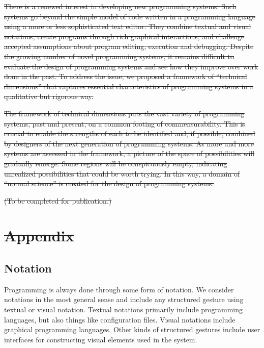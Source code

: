 \documentclass[english,submission]{programming}
\providecommand{\DIFdel}[1]{{\protect\color{red}\sout{#1}}}                      %
\providecommand{\DIFdelend}{} %
\begin{document}
\DIFdel{There is a renewed interest in developing new programming systems. Such
systems go beyond the simple model of code written in a programming
language using a more or less sophisticated text editor. They combine
textual and visual notations, create programs through rich graphical
interactions, and challenge accepted assumptions about program editing,
execution and debugging. Despite the growing number of novel programming
systems, it remains difficult to evaluate the design of programming
systems and see how they improve over work done in the past. To address
the issue, we proposed a framework of ``technical dimensions'' that
captures essential characteristics of programming systems in a
qualitative but rigorous way.
}%

\DIFdel{The framework of technical dimensions puts the vast variety of
programming systems, past and present, on a common footing of
commensurability. This is crucial to enable the strengths of each to be
identified and, if possible, combined by designers of the next
generation of programming systems. As more and more systems are assessed
in the framework, a picture of the space of possibilities will gradually
emerge. Some regions will be conspicuously empty, indicating unrealized
possibilities that could be worth trying. In this way, a domain of
``normal science'' is created for the design of programming systems.
}%


\DIFdel{(To be completed for publication.)
}%

\section{\DIFdel{Appendix}}
\addtocounter{section}{-1}%

\DIFdelend \hypertarget{notation}{%
\subsection{Notation}\label{notation}}


Programming is always done through some form of notation. We consider
notations in the most general sense and include any structured gesture
using textual or visual notation. Textual notations primarily include
programming languages, but also things like configuration files. Visual
notations include graphical programming languages. Other kinds of
structured gestures include user interfaces for constructing visual
elements used in the system.
\end{document}
